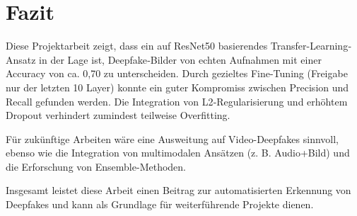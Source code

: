 \chapter{Fazit}
\label{chap:fazit}

Diese Projektarbeit zeigt, dass ein auf ResNet50 basierendes Transfer-Learning‐Ansatz in der Lage ist, Deepfake‐Bilder von echten Aufnahmen mit einer Accuracy von ca. 0,70 zu unterscheiden. Durch gezieltes Fine-Tuning (Freigabe nur der letzten 10 Layer) konnte ein guter Kompromiss zwischen Precision und Recall gefunden werden. Die Integration von L2‐Regularisierung und erhöhtem Dropout verhindert zumindest teilweise Overfitting. 

Für zukünftige Arbeiten wäre eine Ausweitung auf Video-Deepfakes sinnvoll, ebenso wie die Integration von multimodalen Ansätzen (z. B. Audio+Bild) und die Erforschung von Ensemble-Methoden.  

Insgesamt leistet diese Arbeit einen Beitrag zur automatisierten Erkennung von Deepfakes und kann als Grundlage für weiterführende Projekte dienen.  
